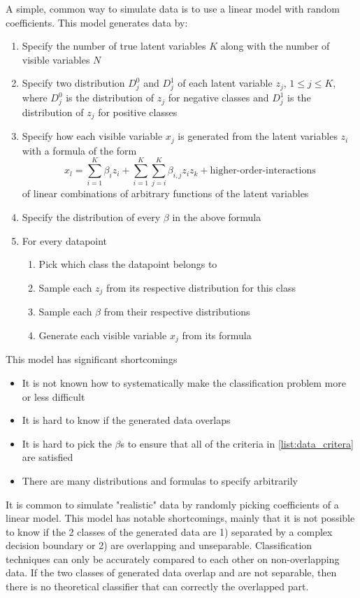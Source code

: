 \documentclass{article}
\begin{document}
A simple, common way to simulate data is to use a linear model with random
coefficients. This model generates data by:
\begin{enumerate}
    \item Specify the number of true latent variables $K$ along with the number
        of visible variables $N$
    \item Specify two distribution $D_j^0$ and $D_j^1$ of each latent variable
        $z_j$, $1 \leq j \leq K$, where $D_j^0$ is the distribution of $z_j$
        for negative classes and $D_j^1$ is the distribution of $z_j$ for
        positive classes
    \item Specify how each visible variable $x_j$ is generated from the latent
        variables $z_i$ with a formula of the form
        $$x_l = \sum_{i=1}^K \beta_i z_i + \sum_{i=1}^K\sum_{j=i}^K \beta_{i,j} z_i z_k + \text{higher-order-interactions}$$
        of linear combinations of arbitrary functions of the latent variables
    \item Specify the distribution of every $\beta$ in the above formula
    \item For every datapoint
    \begin{enumerate}
        \item Pick which class the datapoint belongs to
        \item Sample each $z_j$ from its respective distribution for this class
        \item Sample each $\beta$ from their respective distributions
        \item Generate each visible variable $x_j$ from its formula
    \end{enumerate}
\end{enumerate}

This model has significant shortcomings
\begin{itemize}
    \item It is not known how to systematically make the classification problem more or less difficult
    \item It is hard to know if the generated data overlaps
    \item It is hard to pick the $\beta$s to ensure that all of the criteria in \ref{list:data_critera} are satisfied
    \item There are many distributions and formulas to specify arbitrarily
\end{itemize}
It is common to simulate "realistic" data by randomly picking coefficients of a
linear model. This model has notable shortcomings, mainly that it is not
possible to know if the 2 classes of the generated data are 1) separated by a
complex decision boundary or 2) are overlapping and unseparable. Classification
techniques can only be accurately compared to each other on non-overlapping
data. If the two classes of generated data overlap and are not separable, then
there is no theoretical classifier that can correctly the overlapped part.
\end{document}
